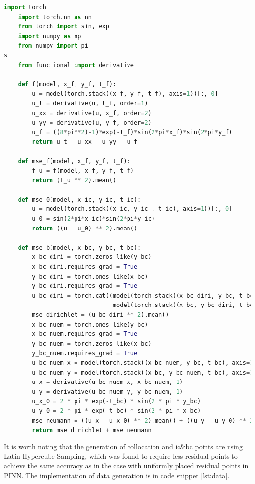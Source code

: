 \documentclass[11pt, a4paper]{article}
\begin{document}
    \lstset{style=mystyle}
    \begin{lstlisting}[language=Python, caption=Implementation of MSEs using PyTorch, label={lst:mse}]
    import torch
    import torch.nn as nn
    from torch import sin, exp
    import numpy as np
    from numpy import pi
s
    from functional import derivative

    def f(model, x_f, y_f, t_f):
        u = model(torch.stack((x_f, y_f, t_f), axis=1))[:, 0]
        u_t = derivative(u, t_f, order=1)
        u_xx = derivative(u, x_f, order=2)
        u_yy = derivative(u, y_f, order=2)
        u_f = ((8*pi**2)-1)*exp(-t_f)*sin(2*pi*x_f)*sin(2*pi*y_f)
        return u_t - u_xx - u_yy - u_f

    def mse_f(model, x_f, y_f, t_f):
        f_u = f(model, x_f, y_f, t_f)
        return (f_u ** 2).mean()

    def mse_0(model, x_ic, y_ic, t_ic):
        u = model(torch.stack((x_ic, y_ic , t_ic), axis=1))[:, 0]
        u_0 = sin(2*pi*x_ic)*sin(2*pi*y_ic)
        return ((u - u_0) ** 2).mean()

    def mse_b(model, x_bc, y_bc, t_bc):
        x_bc_diri = torch.zeros_like(y_bc)
        x_bc_diri.requires_grad = True
        y_bc_diri = torch.ones_like(x_bc)
        y_bc_diri.requires_grad = True
        u_bc_diri = torch.cat((model(torch.stack((x_bc_diri, y_bc, t_bc), axis=1))[:, 0],
                               model(torch.stack((x_bc, y_bc_diri, t_bc), axis=1))[:, 0]))
        mse_dirichlet = (u_bc_diri ** 2).mean()
        x_bc_nuem = torch.ones_like(y_bc)
        x_bc_nuem.requires_grad = True
        y_bc_nuem = torch.zeros_like(x_bc)
        y_bc_nuem.requires_grad = True
        u_bc_nuem_x = model(torch.stack((x_bc_nuem, y_bc, t_bc), axis=1))[:, 0]
        u_bc_nuem_y = model(torch.stack((x_bc, y_bc_nuem, t_bc), axis=1))[:, 0]
        u_x = derivative(u_bc_nuem_x, x_bc_nuem, 1)
        u_y = derivative(u_bc_nuem_y, y_bc_nuem, 1)
        u_x_0 = 2 * pi * exp(-t_bc) * sin(2 * pi * y_bc)
        u_y_0 = 2 * pi * exp(-t_bc) * sin(2 * pi * x_bc)
        mse_neumann = ((u_x - u_x_0) ** 2).mean() + ((u_y - u_y_0) ** 2).mean()
        return mse_dirichlet + mse_neumann
    \end{lstlisting}

    It is worth noting that the generation of collocation and ic\&bc points are using Latin Hypercube Sampling, 
    which was found to require less residual points to achieve the same accuracy as in the case with uniformly placed residual points in PINN. \cite{LHS}
    The implementation of data generation is in code snippet \ref{lst:data}.
\end{document}
